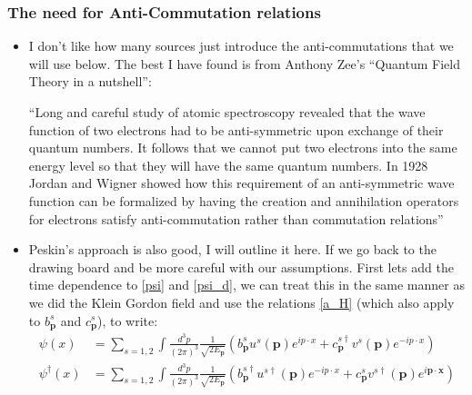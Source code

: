\documentclass[11pt]{article}
\numberwithin{equation}{section}
\begin{document}
\subsubsection{The need for Anti-Commutation relations}
\begin{itemize}
  \item I don't like how many sources just introduce the anti-commutations that we will use below. The best I have found is from Anthony Zee's ``Quantum Field Theory in a nutshell'': 

  ``Long and careful study of atomic spectroscopy revealed that the wave function of two electrons had to be anti-symmetric upon exchange of their quantum numbers. It follows that we cannot put two electrons into the same energy level so that they will have the same quantum numbers. In 1928 Jordan and Wigner showed how this requirement of an anti-symmetric wave function can be formalized by having the creation and annihilation operators for electrons satisfy anti-commutation rather than commutation relations''

\item Peskin's  approach is also good, I will outline it here. If we go back to the drawing board and be more careful with our assumptions. First lets add the time dependence to \ref{psi} and \ref{psi_d}, we can treat this in the same manner as we did the Klein Gordon field and use the relations \ref{a_H} (which also apply to $b^{s}_{\textbf{p}}$ and $c^{s}_{\textbf{p}}$), to write: 
\begin{align*}
      \psi(x) &= \sum_{s=1,2}\int \frac{d^3p}{(2\pi)^3}\frac{1}{\sqrt{2E_{\textbf{p}}}}\left(b^{s}_{\textbf{p}}u^s(\textbf{p})e^{ip\cdot x}+c^{s \dagger}_{\textbf{p}}v^s(\textbf{p})e^{-ip\cdot x}\right)  \\
      \psi^{\dagger}(x) &= \sum_{s=1,2}\int \frac{d^3p}{(2\pi)^3}\frac{1}{\sqrt{2E_{\textbf{p}}}}\left(b^{s \dagger}_{\textbf{p}}u^{s\dagger}(\textbf{p})e^{-ip\cdot x}+c^{s }_{\textbf{p}}v^{s\dagger}(\textbf{p})e^{i\textbf{p}\cdot\textbf{x}}\right)
 \end{align*} 


\end{itemize}
\end{document}
